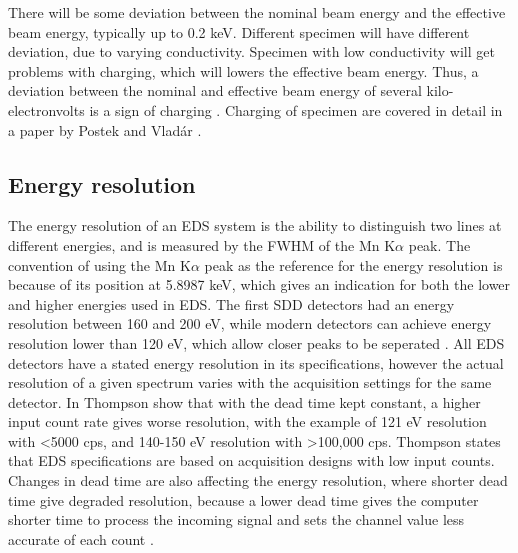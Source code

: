 
There will be some deviation between the nominal beam energy and the effective beam energy, typically up to 0.2 keV.
Different specimen will have different deviation, due to varying conductivity.
Specimen with low conductivity will get problems with charging, which will lowers the effective beam energy.
Thus, a deviation between the nominal and effective beam energy of several kilo-electronvolts is a sign of charging \cite{dtsaii_2_manipulating_spectra}.
Charging of specimen are covered in detail in a paper by Postek and Vladár \cite{postek_charging_2015}.














\subsection{Energy resolution}
\label{theory:qc:energyres}


The energy resolution of an EDS system is the ability to distinguish two lines at different energies, and is measured by the FWHM of the Mn K$\alpha$ peak.
The convention of using the Mn K$\alpha$ peak as the reference for the energy resolution is because of its position at 5.8987 keV, which gives an indication for both the lower and higher energies used in EDS.
The first SDD  detectors had an energy resolution between 160 and 200 eV, while modern detectors can achieve energy resolution lower than 120 eV, which allow closer peaks to be seperated \cite{keith_energy_res_2013} .
All EDS detectors have a stated energy resolution in its specifications, however the actual resolution of a given spectrum varies with the acquisition settings for the same detector.
In \cite{keith_energy_res_2013} Thompson show that with the dead time kept constant, a higher input count rate gives worse resolution, with the example of 121 eV resolution with <5000 cps, and 140-150 eV resolution with >100,000 cps.
Thompson states that EDS specifications are based on acquisition designs with low input counts.
Changes in dead time are also affecting the energy resolution, where shorter dead time give degraded resolution, because a lower dead time gives the computer shorter time to process the incoming signal and sets the channel value less accurate of each count .

